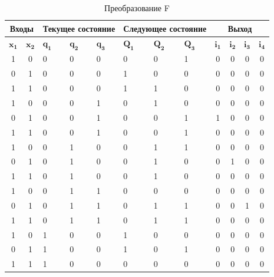 \documentclass[a4paper, final]{article}
\begin{document}
\begin{table}[h!]
  \centering
  \caption{Преобразование F}
  \label{tbl:f}
  \footnotesize

  \begin{tabularx}{\textwidth}{|c|c|X|X|X||X|X|X|c|c|c|c|}
  \hline
  \multicolumn{2}{|c|}{\textbf{Входы}} & \multicolumn{3}{c||}{\textbf{Текущее состояние}} & \multicolumn{3}{c|}{\textbf{Следующее состояние}} & \multicolumn{4}{c|}{\textbf{Выход}} \\
  \hline
  $\mathbf{x_1}$& $\mathbf{x_2}$ & $\mathbf{q_1}$ & $\mathbf{q_2}$ & $\mathbf{q_3}$ & $\mathbf{Q_1}$ & $\mathbf{Q_2}$ & $\mathbf{Q_3}$ & $\mathbf{i_1}$ & $\mathbf{i_2}$ & $\mathbf{i_3}$ & $\mathbf{i_4}$ \\
  \hline
  \hline
  1 & 0 &   0 & 0 & 0 &  0 & 0 & 1 &  0 & 0 & 0 & 0\\
  \hline
  0 & 1 &   0 & 0 & 0 &  1 & 0 & 0 &  0 & 0 & 0 & 0\\
  \hline
  1 & 1 &   0 & 0 & 0 &  1 & 1 & 0 &  0 & 0 & 0 & 0\\
  \hline

  1 & 0 &   0 & 0 & 1 &  0 & 1 & 0 &  0 & 0 & 0 & 0\\
  \hline
  0 & 1 &   0 & 0 & 1 &  0 & 0 & 1 &  1 & 0 & 0 & 0\\
  \hline
  1 & 1 &   0 & 0 & 1 &  0 & 0 & 1 &  0 & 0 & 0 & 0\\

  \hline
  1 & 0 &   0 & 1 & 0 &  0 & 1 & 1 &  0 & 0 & 0 & 0\\
  \hline
  0 & 1 &   0 & 1 & 0 &  0 & 1 & 0 &  0 & 1 & 0 & 0\\
  \hline
  1 & 1 &   0 & 1 & 0 &  0 & 1 & 0 &  0 & 0 & 0 & 0\\
  \hline
  
  1 & 0 &   0 & 1 & 1 &  0 & 0 & 0 &  0 & 0 & 0 & 0\\
  \hline
  0 & 1 &   0 & 1 & 1 &  0 & 1 & 1 &  0 & 0 & 1 & 0\\
  \hline
  1 & 1 &   0 & 1 & 1 &  0 & 1 & 1 &  0 & 0 & 0 & 0\\
  \hline

  1 & 0 &   1 & 0 & 0 &  1 & 0 & 0 &  0 & 0 & 0 & 0\\
  \hline
  0 & 1 &   1 & 0 & 0 &  1 & 0 & 1 &  0 & 0 & 0 & 0\\
  \hline
  1 & 1 &   1 & 0 & 0 &  0 & 0 & 0 &  0 & 0 & 0 & 0\\
  \hline


\end{tabularx}
\end{table}
\end{document}
